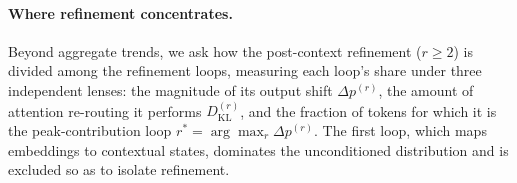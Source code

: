 \paragraph{Where refinement concentrates.}
Beyond aggregate trends, we ask how the post-context refinement ($r \geq 2$) is
divided among the refinement loops, measuring each loop's share under three
independent lenses: the magnitude of its output shift $\Delta p^{(r)}$, the
amount of attention re-routing it performs $D_{\mathrm{KL}}^{(r)}$, and the
fraction of tokens for which it is the peak-contribution loop
$r^* = \arg\max_r \Delta p^{(r)}$.
The first loop, which maps embeddings to contextual states, dominates the
unconditioned distribution and is excluded so as to isolate refinement.

